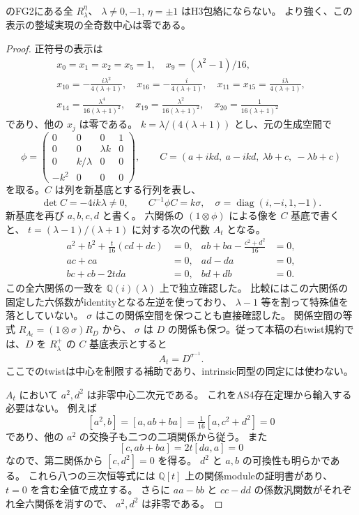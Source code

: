 \begin{proposition}\label{prop:cubic-boundary-R}
\cite{AS4lowpinned}のFG2にある全 $R^\eta_\lambda$、
$\lambda\ne0,-1$, $\eta=\pm1$ はH3包絡にならない。
より強く、この表示の整域実現の全奇数中心は零である。
\end{proposition}
\begin{proof}
正符号の表示は
\[
\begin{gathered}
 x_0=x_1=x_2=x_5=1,\quad x_9=(\lambda^2-1)/16,\\
 x_{10}=-\frac{i\lambda^2}{4(\lambda+1)},\quad
 x_{16}=-\frac{i}{4(\lambda+1)},\quad
 x_{11}=x_{15}=\frac{i\lambda}{4(\lambda+1)},\\
 x_{14}=\frac{\lambda^4}{16(\lambda+1)^2},\quad
 x_{19}=\frac{\lambda^2}{16(\lambda+1)^2},\quad
 x_{20}=\frac1{16(\lambda+1)^2}
\end{gathered}
\]
であり、他の $x_j$ は零である。
$k=\lambda/(4(\lambda+1))$ とし、元の生成空間で
\[
 \phi=\begin{pmatrix}
 0&0&0&1\\0&0&\lambda k&0\\0&k/\lambda&0&0\\-k^2&0&0&0
 \end{pmatrix},\qquad
 C=(a+ikd,\ a-ikd,\ \lambda b+c,\ -\lambda b+c)
\]
を取る。$C$ は列を新基底とする行列を表し、
\[
 \det C=-4ik\lambda\ne0,\qquad
 C^{-1}\phi C=k\sigma,\quad \sigma=\operatorname{diag}(i,-i,1,-1).
\]
新基底を再び $a,b,c,d$ と書く。
六関係の $(1\otimes\phi)$ による像を $C$ 基底で書くと、
$t=(\lambda-1)/(\lambda+1)$ に対する次の代数 $A_t$ となる。
\[
\begin{aligned}
 a^2+b^2+\frac{t}{16}(cd+dc)&=0,&
 ab+ba-\frac{c^2+d^2}{16}&=0,\\
 ac+ca&=0,&ad-da&=0,\\
 bc+cb-2t da&=0,&bd+db&=0.
\end{aligned}
\]
この全六関係の一致を $\mathbb Q(i)(\lambda)$ 上で独立確認した。
比較にはこの六関係の固定した六係数がidentityとなる左逆を使っており、
$\lambda-1$ 等を割って特殊値を落としていない。
$\sigma$ はこの関係空間を保つことも直接確認した。
関係空間の等式 $R_{A_t}=(1\otimes\sigma)R_D$ から、
$\sigma$ は $D$ の関係も保つ。従って本稿の右twist規約では、$D$ を $R^+_\lambda$ の $C$ 基底表示とすると
\[
 A_t=D^{\sigma^{-1}}.
\]
ここでのtwistは中心を制限する補助であり、intrinsic同型の同定には使わない。

$A_t$ において $a^2,d^2$ は非零中心二次元である。
これをAS4存在定理から輸入する必要はない。
例えば
\[
 [a^2,b]=[a,ab+ba]=\tfrac1{16}[a,c^2+d^2]=0
\]
であり、他の $a^2$ の交換子も二つの二項関係から従う。
また
\[
 [c,ab+ba]=2t[da,a]=0
\]
なので、第二関係から $[c,d^2]=0$ を得る。
$d^2$ と $a,b$ の可換性も明らかである。
これら八つの三次恒等式には $\mathbb Q[t]$ 上の関係moduleの証明書があり、
$t=0$ を含む全値で成立する。
さらに $aa-bb$ と $cc-dd$ の係数汎関数がそれぞれ全六関係を消すので、
$a^2,d^2$ は非零である。


\end{proof}
